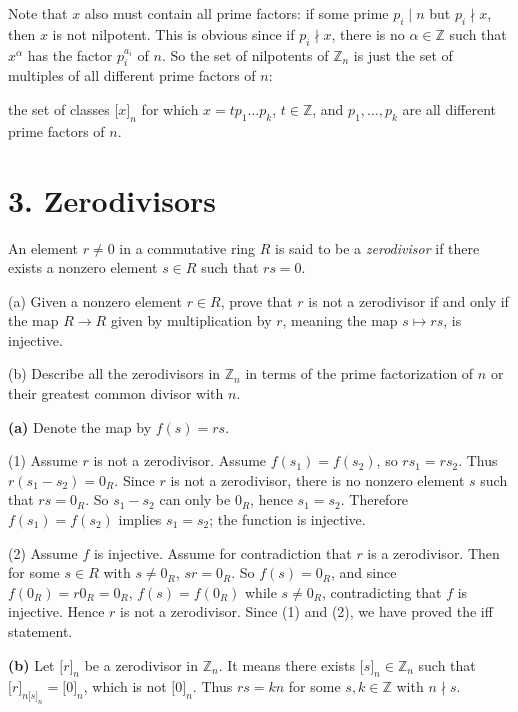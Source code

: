 Note that \(x\) also must contain all prime factors: if some prime \(p_{i} \mid n\) but \(p_{i} \nmid x\), then \(x\) is not nilpotent. This is obvious since if \(p_{i} \nmid x\), there is no \(\alpha \in \mathbb{Z}\) such that \(x^{\alpha}\) has the factor \(p_{i}^{a_{i}}\) of \(n\). So the set of nilpotents of \(\mathbb{Z}_{n}\) is just the set of multiples of all different prime factors of \(n\):

the set of classes \(\lbrack x\rbrack_{n}\) for which \(x = tp_{1}\ldots p_{k}\), \(t \in \mathbb{Z}\), and \(p_{1},\ldots,p_{k}\) are all different prime factors of \(n\).

\section{3. Zerodivisors}

An element \(r \neq 0\) in a commutative ring \(R\) is said to be a \emph{zerodivisor} if there exists a nonzero element \(s \in R\) such that \(rs = 0\).

(a) Given a nonzero element \(r \in R\), prove that \(r\) is not a zerodivisor if and only if the map \(R\rightarrow R\) given by multiplication by \(r\), meaning the map \(s\mapsto rs\), is injective.

(b) Describe all the zerodivisors in \(\mathbb{Z}_{n}\) in terms of the prime factorization of \(n\) or their greatest common divisor with \(n\).

\textbf{(a)} Denote the map by \(f(s) = rs\).

(1) Assume \(r\) is not a zerodivisor. Assume \(f\left( s_{1} \right) = f\left( s_{2} \right)\), so \(rs_{1} = rs_{2}\). Thus \(r\left( {s_{1} - s_{2}} \right) = 0_{R}\). Since \(r\) is not a zerodivisor, there is no nonzero element \(s\) such that \(rs = 0_{R}\). So \(s_{1} - s_{2}\) can only be \(0_{R}\), hence \(s_{1} = s_{2}\). Therefore \(f\left( s_{1} \right) = f\left( s_{2} \right)\) implies \(s_{1} = s_{2}\); the function is injective.

(2) Assume \(f\) is injective. Assume for contradiction that \(r\) is a zerodivisor. Then for some \(s \in R\) with \(s \neq 0_{R}\), \(sr = 0_{R}\). So \(f(s) = 0_{R}\), and since \(f\left( 0_{R} \right) = r0_{R} = 0_{R}\), \(f(s) = f\left( 0_{R} \right)\) while \(s \neq 0_{R}\), contradicting that \(f\) is injective. Hence \(r\) is not a zerodivisor. Since (1) and (2), we have proved the iff statement.

\textbf{(b)} Let \(\lbrack r\rbrack_{n}\) be a zerodivisor in \(\mathbb{Z}_{n}\). It means there exists \(\lbrack s\rbrack_{n} \in \mathbb{Z}_{n}\) such that \(\lbrack r\rbrack_{{n{\lbrack s\rbrack}}_{n}} = \lbrack 0\rbrack_{n}\), which is not \(\lbrack 0\rbrack_{n}\). Thus \(rs = kn\) for some \(s,k \in \mathbb{Z}\) with \(n \nmid s\).


